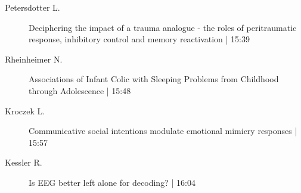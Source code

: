 \begin{symposium}
\begin{description}
                \item [ Petersdotter L.] Deciphering the impact of a trauma analogue - the roles of peritraumatic response, inhibitory control and memory reactivation \textcolor{mygray}{ | 15:39}    
                
                \item [ Rheinheimer N.] Associations of Infant Colic with Sleeping Problems from Childhood through Adolescence \textcolor{mygray}{ | 15:48}    
                
                \item [ Kroczek L.] Communicative social intentions modulate emotional mimicry responses \textcolor{mygray}{ | 15:57}    
                
                \item [ Kessler R.] Is EEG better left alone for decoding? \textcolor{mygray}{ | 16:04}    
                
            \end{description} 
            \end{symposium}
            